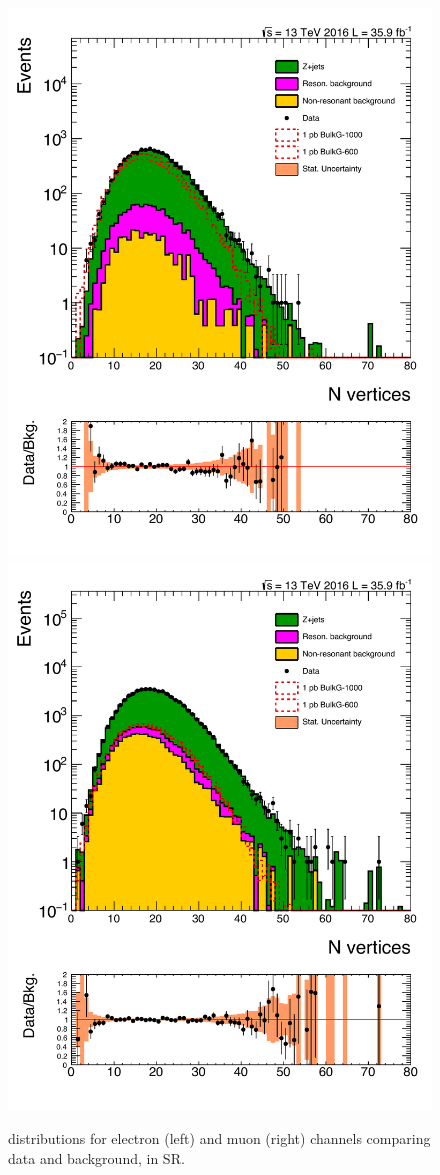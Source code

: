 \begin{figure}[htbp!]
\centering
\includegraphics[width=0.46\linewidth,page=16]{figures/ReMiniSummer16_DT_PhReMiniMCRcFixXsec_GMCPhPtWt_SRdPhiGT0p5_puWeightsummer16_muoneg_gjet_metfilter_unblind_el_log_1pb.pdf}
\includegraphics[width=0.46\linewidth,page=16]{figures/ReMiniSummer16_DT_PhReMiniMCRcFixXsec_GMCPhPtWt_SRdPhiGT0p5_puWeightsummer16_muoneg_gjet_metfilter_unblind_mu_log_1pb.pdf}
\caption{\ptmiss distributions for electron (left) and muon (right) channels
comparing data and background, in SR.}
\label{fig:SR_gjet_met_wide}
\end{figure}

